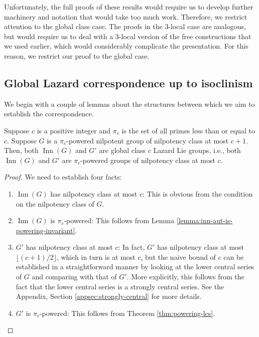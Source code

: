Unfortunately, the full proofs of these results would require us to
develop further machinery and notation that would take too much
work. Therefore, we restrict attention to the global class case. The
proofs in the $3$-local case are analogous, but would require us to
deal with a $3$-local version of the free constructions that we used
earlier, which would considerably complicate the presentation. For
this reason, we restrict our proof to the global case.

\subsection{Global Lazard correspondence up to isoclinism}\label{sec:glcuti-def}

We begin with a couple of lemmas about the structures between which we
aim to establish the correspondence.

\begin{lemma}\label{lemma:global-class-one-more}
  Suppose $c$ is a positive integer and $\pi_c$ is the set of all
  primes less than or equal to $c$. Suppose $G$ is a $\pi_c$-powered
  nilpotent group of nilpotency class at most $c + 1$. Then, both
  $\operatorname{Inn}(G)$ and $G'$ are global class $c$ Lazard Lie
  groups, i.e., both $\operatorname{Inn}(G)$ and $G'$ are
  $\pi_c$-powered groups of nilpotency class at most $c$.
\end{lemma}

\begin{proof}
  We need to establish four facts:

  \begin{enumerate}
  \item $\operatorname{Inn}(G)$ has nilpotency class at most $c$: This
    is obvious from the condition on the nilpotency class of $G$.
  \item $\operatorname{Inn}(G)$ is $\pi_c$-powered: This follows from
    Lemma \ref{lemma:inn-aut-is-powering-invariant}.
  \item $G'$ has nilpotency class at most $c$: In fact, $G'$ has
    nilpotency class at most $\lfloor (c + 1)/2 \rfloor$, which in
    turn is at most $c$, but the naive bound of $c$ can be established
    in a straightforward manner by looking at the lower central series
    of $G$ and comparing with that of $G'$. More explicitly, this
    follows from the fact that the lower central series is a strongly
    central series. See the Appendix, Section
    \ref{appsec:strongly-central} for more details.
  \item $G'$ is $\pi_c$-powered: This follows from Theorem
    \ref{thm:powering-lcs}.
  \end{enumerate}
\end{proof}

